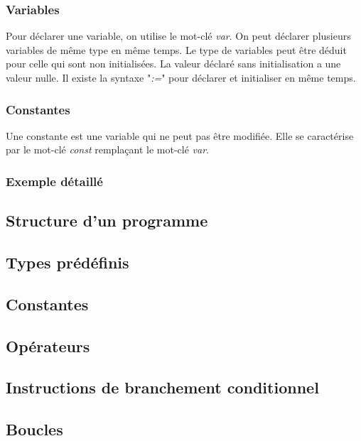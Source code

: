 \documentclass[11pt]{article}
\begin{document}
\subsubsection{Variables}

Pour déclarer une variable, on utilise le mot-clé \textit{var}. On peut déclarer plusieurs variables de même type en même temps. Le type de variables 
peut être déduit pour celle qui sont non initialisées. La valeur déclaré sans initialisation a une valeur nulle. 
Il existe la syntaxe "\textit{:=}" pour déclarer et initialiser en même temps. 

\subsubsection{Constantes}

Une constante est une variable qui ne peut pas être modifiée. Elle se caractérise par le mot-clé \textit{const} remplaçant le mot-clé \textit{var}. 

\subsubsection{Exemple détaillé}

\subsection{Structure d'un programme}

\subsection{Types prédéfinis}

\subsection{Constantes}

\subsection{Opérateurs}

\subsection{Instructions de branchement conditionnel}

\subsection{Boucles}
\end{document}
